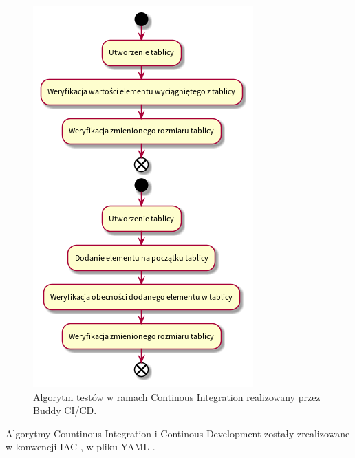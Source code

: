 \begin{figure}[H]
	\begin{center}
		\includegraphics[scale=0.6]{media/ContinousIntegration.png}
	\end{center}
	\caption{Algorytm testów w ramach Continous Integration realizowany przez Buddy CI/CD.}
	\label{rys:continous-integration}
\end{figure}

Algorytmy Countinous Integration i Continous Development zostały zrealizowane w konwencji IAC \cite{iac}, w pliku YAML \cite{yaml}.